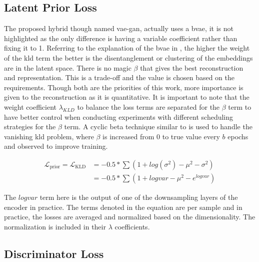 \subsection{Latent Prior Loss}

The proposed hybrid though named \ac{vae}-\ac{gan}, actually uses a \ac{bvae}, it is not highlighted as the only difference is having a variable coefficient rather than fixing it to 1. Referring to the explanation of the \ac{bvae} in , the higher the weight of the \ac{kld} term the better is the disentanglement or clustering of the embeddings are in the latent space. There is no magic $\beta$ that gives the best reconstruction and representation. This is a trade-off and the value is chosen based on the requirements. Though both are the priorities of this work, more importance is given to the reconstruction as it is quantitative. It is important to note that the weight coefficient $\lambda_{KLD}$ to balance the loss terms are separated for the $\beta$ term to have better control when conducting experiments with different scheduling strategies for the $\beta$ term. A cyclic beta technique similar to \cite{cyclicbeta} is used to handle the vanishing \ac{kld} problem, where $\beta$ is increased from 0 to true value every $b$ epochs and observed to improve training.

\begin{equation} \label{eqn:loss_kld}
    \begin{split}
        \mathcal{L}_{\text {prior}} = \mathcal{L}_{\text {KLD}} &= -0.5 * \sum (1 + log(\sigma^2) - \mu^2 - \sigma^2) \\
        &= -0.5 * \sum (1 + logvar - \mu^2 - e^{logvar})
    \end{split}
\end{equation}

The $logvar$ term here is the output of one of the downsampling layers of the encoder in practice. The terms denoted in the equation are per sample and in practice, the losses are averaged and normalized based on the dimensionality. The normalization is included in their $\lambda$ coefficients.

\subsection{Discriminator Loss}

